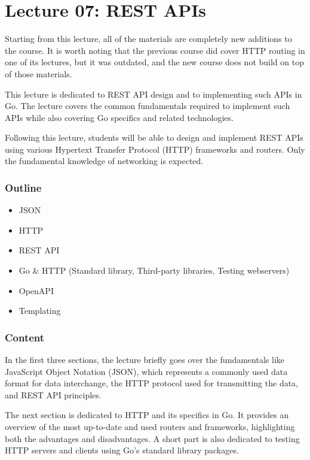 \documentclass[
  digital,
  color,
  oneside,
  nosansbold,
  nocolorbold,
  nolof,
  nolot,
]{fithesis4}
\begin{document}
\section{Lecture 07: REST APIs}

Starting from this lecture, all of the materials are completely new additions to the course. It is worth noting that the previous course did cover HTTP routing in one of its lectures, but it was outdated, and the new course does not build on top of those materials.

This lecture is dedicated to REST API design and to implementing such APIs in Go. The lecture covers the common fundamentals required to implement such APIs while also covering Go specifics and related technologies. 

Following this lecture, students will be able to design and implement REST APIs using various Hypertext Transfer Protocol (HTTP) frameworks and routers. Only the fundamental knowledge of networking is expected.

\subsubsection{Outline}

\begin{itemize}
    \item JSON
    \item HTTP
    \item REST API
    \item Go \& HTTP (Standard library, Third-party libraries, Testing webservers)
    \item OpenAPI
    \item Templating
\end{itemize}

\subsubsection{Content}

In the first three sections, the lecture briefly goes over the fundamentals like JavaScript Object Notation (JSON), which represents a commonly used data format for data interchange, the HTTP protocol used for transmitting the data, and REST API principles.

The next section is dedicated to HTTP and its specifics in Go. It provides an overview of the most up-to-date and used routers and frameworks, highlighting both the advantages and disadvantages. A short part is also dedicated to testing HTTP servers and clients using Go's standard library packages.
\end{document}
